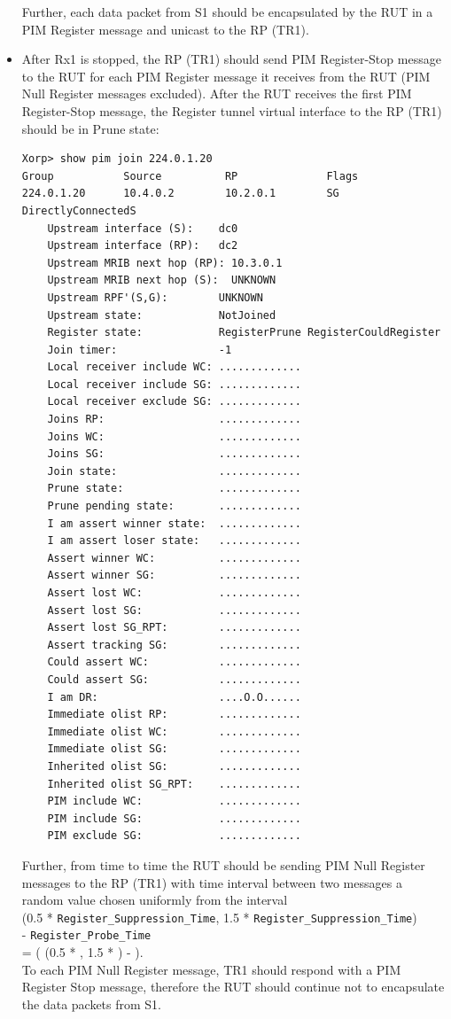 \documentclass[11pt]{report}
\begin{document}
\begin{itemize}
  Further, each data packet from S1 should be encapsulated by the RUT in a
  PIM Register message and unicast to the RP (TR1).

  \item After Rx1 is stopped, the RP (TR1) should send PIM Register-Stop
  message to the RUT for each PIM Register message it receives from the RUT
  (PIM Null Register messages excluded). After the RUT receives the first
  PIM Register-Stop message, the Register tunnel virtual interface to the RP
  (TR1) should be in Prune state:

\begin{verbatim}
Xorp> show pim join 224.0.1.20
Group           Source          RP              Flags
224.0.1.20      10.4.0.2        10.2.0.1        SG DirectlyConnectedS 
    Upstream interface (S):    dc0
    Upstream interface (RP):   dc2
    Upstream MRIB next hop (RP): 10.3.0.1
    Upstream MRIB next hop (S):  UNKNOWN
    Upstream RPF'(S,G):        UNKNOWN
    Upstream state:            NotJoined 
    Register state:            RegisterPrune RegisterCouldRegister 
    Join timer:                -1
    Local receiver include WC: .............
    Local receiver include SG: .............
    Local receiver exclude SG: .............
    Joins RP:                  .............
    Joins WC:                  .............
    Joins SG:                  .............
    Join state:                .............
    Prune state:               .............
    Prune pending state:       .............
    I am assert winner state:  .............
    I am assert loser state:   .............
    Assert winner WC:          .............
    Assert winner SG:          .............
    Assert lost WC:            .............
    Assert lost SG:            .............
    Assert lost SG_RPT:        .............
    Assert tracking SG:        .............
    Could assert WC:           .............
    Could assert SG:           .............
    I am DR:                   ....O.O......
    Immediate olist RP:        .............
    Immediate olist WC:        .............
    Immediate olist SG:        .............
    Inherited olist SG:        .............
    Inherited olist SG_RPT:    .............
    PIM include WC:            .............
    PIM include SG:            .............
    PIM exclude SG:            .............
\end{verbatim}

  Further, from time to time the RUT should be sending PIM Null Register
  messages to the RP (TR1) with time interval between two messages a random
  value chosen uniformly from the interval \\
  (0.5 * \verb=Register_Suppression_Time=,
  1.5 * \verb=Register_Suppression_Time=) \\
  - \verb=Register_Probe_Time= \\
  = ( (0.5 * {\PimsmRegisterSuppressionTime}, 1.5 *
  {\PimsmRegisterSuppressionTime}) - {\PimsmRegisterProbeTime} ).\\
  To each PIM Null Register message, TR1 should respond with a PIM Register
  Stop message, therefore the RUT should continue not to encapsulate the data
  packets from S1.


\end{itemize}
\end{document}
